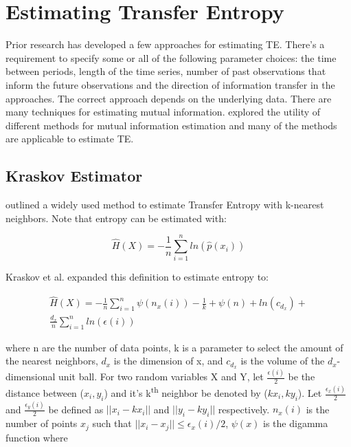 \section{Estimating Transfer Entropy} \label{intro:estimateTE}

Prior research has developed a few approaches for estimating TE. There's a requirement to specify some or all of the following parameter choices: the time between periods, length of the time series, number of past observations that inform the future observations and the direction of information transfer in the approaches. The correct approach depends on the underlying data. There are many techniques for estimating mutual information. \cite{EstimatingTE} explored the utility of different methods for mutual information estimation  and many of the methods  are applicable to estimate TE.

\subsection{Kraskov Estimator} \label{intro:Kraskov}


\cite{kraskovEstimator} outlined a widely used method  to estimate Transfer Entropy with  k-nearest neighbors. Note that entropy can be estimated with:

\begin{equation}
\hat{H}(X) = - \frac{1}{n} \sum^n_{i=1} ln (\hat{p}(x_i)) 
\end{equation}

\noindent Kraskov et al. expanded this definition to estimate entropy to:

\setlength{\arraycolsep}{0.0em}
\begin{eqnarray}
\hat{H}(X) = - \frac{1}{n} \sum^n_{i=1} \psi(n_x(i)) - \frac{1}{k} + \psi(n) + ln (c_{d_x}) + \nonumber\\
 \frac{d_x}{n} \sum^n_{i=1} ln (\epsilon(i))
\end{eqnarray}
\setlength{\arraycolsep}{1pt}

\noindent where n are the number of data points, k is a parameter to select the amount of the nearest neighbors,  \(d_x\) is the dimension of x, and \(c_{d_x}\) is the volume of the \(d_x\)-dimensional unit ball. For two random variables X and Y, let \( \frac{\epsilon(i)}{2} \) be the distance between (\(x_i,y_i\)) and it's k\textsuperscript{th} neighbor be denoted by (\(kx_i,ky_i\)). Let \(\frac{\epsilon_x(i)}{2}\) and  \(\frac{\epsilon_y(i)}{2}\) be defined as \( ||x_i-kx_i ||\) and \( ||y_i-ky_i || \) respectively. \(n_x(i)\) is the number of points \(x_j\) such that \(||x_i - x_j  || \leq \epsilon_x(i)/2\), \(\psi(x)\) is the digamma function where

